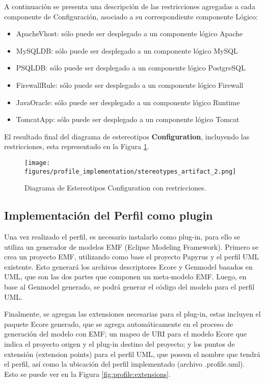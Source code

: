 A continuación se presenta una descripción de las restricciones agregadas a cada componente de Configuración, asociado a su correspondiente componente Lógico:

\begin{itemize}
    \item ApacheVhost: sólo puede ser desplegado a un componente lógico Apache
    \item MySQLDB: sólo puede ser desplegado a un componente lógico MySQL
    \item PSQLDB: sólo puede ser desplegado a un componente lógico PostgreSQL
    \item FirewallRule: sólo puede ser desplegado a un componente lógico Firewall
    \item JavaOracle: sólo puede ser desplegado a un componente lógico Runtime
    \item TomcatApp: sólo puede ser desplegado a un componente lógico Tomcat
\end{itemize}

El resultado final del diagrama de estereotipos \textbf{Configuration}, incluyendo las restricciones, esta representado en la Figura \ref{fig:profile:artifact_final}.

\begin{figure}[htbp]
    \centering
    \texttt{[image: figures/profile\_implementation/stereotypes\_artifact\_2.png]}
    \caption{Diagrama de Estereotipos Configuration con restricciones.}
    \label{fig:profile:artifact_final}
\end{figure}

\subsection{Implementación del Perfil como plugin}

Una vez realizado el perfil, es necesario instalarlo como plug-in, para ello se utiliza un generador de modelos EMF (Eclipse Modeling Framework). Primero se crea un proyecto EMF, utilizando como base el proyecto Papyrus y el perfil UML existente. Esto generará los archivos descriptores Ecore y Genmodel basados en UML, que son las dos partes que componen un meta-modelo EMF. Luego, en base al Genmodel generado, se podrá generar el código del modelo para el perfil UML.

Finalmente, se agregan las extensiones necesarias para el plug-in, estas incluyen el paquete Ecore generado, que se agrega automáticamente en el proceso de generación del modelo con EMF; un mapeo de URI para el modelo Ecore que indica el proyecto origen y el plug-in destino del proyecto; y los puntos de extensión (extension points) para el perfil UML, que poseen el nombre que tendrá el perfil, así como la ubicación del perfil implementado (archivo .profile.uml). Esto se puede ver en la Figura \ref{fig:profile:extensions}.

